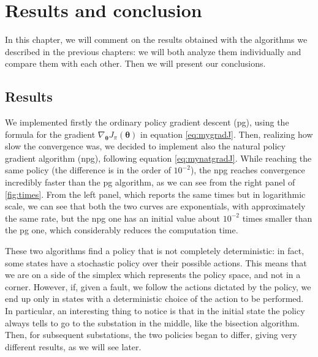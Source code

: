 \chapter{Results and conclusion}


In this chapter, we will comment on the results obtained with the algorithms we described in the previous chapters: we will both analyze them individually and compare them with each other. Then we will present our conclusions.


\section{Results}


We implemented firstly the ordinary policy gradient descent (\acrshort{pg}), using the formula for the gradient $\nabla_{\boldsymbol \theta} J_\pi (\boldsymbol \theta)$ in equation \eqref{eq:mygradJ}. Then, realizing how slow the convergence was, we decided to implement also the natural policy gradient algorithm (\acrshort{npg}), following equation \eqref{eq:mynatgradJ}. While reaching the same policy (the difference is in the order of $10^{-2}$), the \acrshort{npg} reaches convergence incredibly faster than the \acrshort{pg} algorithm, as we can see from the right panel of \autoref{fig:times}. From the left panel, which reports the same times but in logarithmic scale, we can see that both the two curves are exponentials, with approximately the same rate, but the \acrshort{npg} one has an initial value about $10^{-2}$ times smaller than the \acrshort{pg} one, which considerably reduces the computation time.

These two algorithms find a policy that is not completely deterministic: in fact, some states have a stochastic policy over their possible actions. This means that we are on a side of the simplex which represents the policy space, and not in a corner. However, if, given a fault, we follow the actions dictated by the policy, we end up only in states with a deterministic choice of the action to be performed. In particular, an interesting thing to notice is that in the initial state the policy always tells to go to the substation in the middle, like the bisection algorithm. Then, for subsequent substations, the two policies began to differ, giving very different results, as we will see later.

